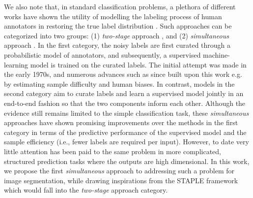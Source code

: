 
We also note that, in standard classification problems, a plethora of different works have shown the utility of modelling the labeling process of human annotators in restoring the true label distribution \cite{raykar2010learning,khetan2017learning,tanno2019learning}. Such approaches can be categorized into two groups: (1) \textit{two-stage} approach \cite{dawid1979maximum,smyth1995inferring,whitehill2009whose,welinder2010multidimensional,rodrigues2013learning}, and (2) \textit{simultaneous} approach \cite{raykar2009supervised,yan2010modeling,branson2017lean,van2018lean,khetan2017learning,tanno2019learning,sudre2019let}. In the first category, the noisy labels are first curated through a probabilistic model of annotators, and subsequently, a supervised machine-learning model is trained on the curated labels. The initial attempt \cite{dawid1979maximum} was made in the early 1970s, and numerous advances such as \cite{smyth1995inferring,whitehill2009whose,welinder2010multidimensional,rodrigues2013learning} since built upon this work e.g. by estimating sample difficulty and human biases. In contrast, models in the second category aim to curate labels and learn a supervised model jointly in an end-to-end fashion \cite{raykar2009supervised,yan2010modeling,branson2017lean,van2018lean,khetan2017learning,tanno2019learning} so that the two components inform each other. Although the evidence still remains limited to the simple classification task, these \textit{simultaneous} approaches have shown promising improvements over the methods in the first category in terms of the predictive performance of the supervised model and the sample efficiency (i.e., fewer labels are required per input). However, to date very little attention has been paid to the same problem in more complicated, structured prediction tasks where the outputs are high dimensional. In this work, we propose the first \textit{simultaneous} approach to addressing such a problem for image segmentation, while drawing inspirations from the STAPLE framework \cite{warfield2004simultaneous} which would fall into the \textit{two-stage} approach category. 


